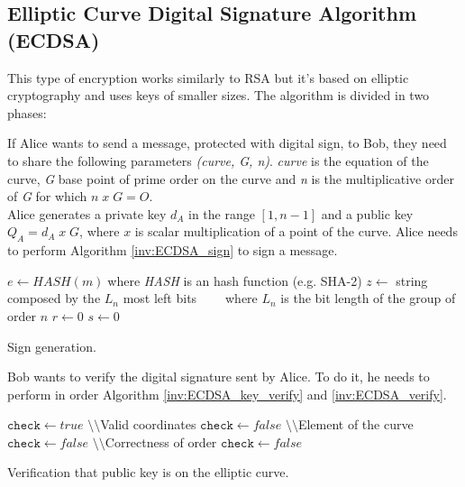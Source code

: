 \subsection{Elliptic Curve Digital Signature Algorithm (ECDSA)}
This type of encryption works similarly to RSA but it's based on elliptic cryptography and uses keys of smaller sizes. The algorithm is divided in two phases:
\begin{itemize}
{If Alice wants to send a message, protected with digital sign, to Bob, they need to share the following parameters \textit{(curve, G, n)}. \textit{curve} is the equation of the curve, \textit{G} base point of prime order on the curve and \textit{n} is the multiplicative order of \textit{G} for which $n\; x\; G = O$.\\
Alice generates a private key $d_A$ in the range $[1, n-1]$ and a public key $Q_A=d_A\; x\; G$, where $x$ is scalar multiplication of a point of the curve. Alice needs to perform Algorithm \ref{inv:ECDSA_sign} to sign a message.
\begin{algorithm}[h]
\DontPrintSemicolon
{}
\BlankLine
$e\gets HASH(m)\;$where \textit{HASH} is an hash function (e.g. SHA-2)\;
\BlankLine
$z \gets$ string composed by the $L_n$ most left bits\;
$\;\;\;\;\;\;\;$where $L_n$ is the bit length of the group of order $n$\;
$r\gets 0$\;
$s\gets 0$\;
\BlankLine
{}
\caption{Sign generation.}\label{inv:ECDSA_sign}
\end{algorithm}
}
{Bob wants to verify the digital signature sent by Alice. To do it, he needs to perform in order Algorithm \ref{inv:ECDSA_key_verify} and \ref{inv:ECDSA_verify}.
\begin{algorithm}[h]
\DontPrintSemicolon
{}
\BlankLine
$\mathtt{check}\gets true$\;
\BlankLine
$\setminus\setminus$Valid coordinates\;
{	
$\mathtt{check}\gets false$\;
}
\BlankLine
$\setminus\setminus$Element of the curve\;
{	
$\mathtt{check}\gets false$\;
}
\BlankLine
$\setminus\setminus$Correctness of order\;
{	
$\mathtt{check}\gets false$\;
}
\caption{Verification that public key is on the elliptic curve.}\label{inv:ECDSA_key_verify}
\end{algorithm}

}
\end{itemize}
